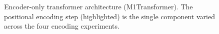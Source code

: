 \begin{figure}[H]
\caption{Encoder-only transformer architecture (M1Transformer). The positional encoding step (highlighted) is the single component varied across the four encoding experiments.}
\label{fig:tikz_architecture}
\end{figure}